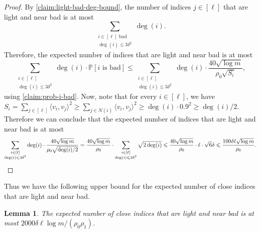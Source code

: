 \documentclass[reqno]{amsart}
\newtheorem{lemma}[theorem]{Lemma}
\theoremstyle{remark}
\theoremstyle{definition}
\numberwithin{theorem}{section}
\renewcommand{\(}{\bigl(}
\renewcommand{\)}{\bigr)\vphantom{)}}
\renewcommand{\le}{\leqslant}
\renewcommand{\ge}{\geqslant}
\renewcommand{\P}{\mathbb{P}}
\newcommand{\ang}[1]{\langle#1\rangle}
\begin{document}
\begin{proof}
By \cref{claim:light-bad-deg-bound}, the number of indices $j\in [\ell]$ that are light and near bad is at most 
\[\sum_{\substack{i\in [\ell]\text{ bad}\\\deg(i)\le 3\delta^2}}\deg(i).\]
Therefore, the expected number of indices that are light and near bad is at most
\[\sum_{\substack{i\in [\ell]\\ \deg(i)\le 3\delta^2}} \deg(i)\cdot \P[i\text{ is bad}] \le \sum_{\substack{i\in [\ell]\\ \deg(i)\le 3\delta^2}} \deg(i)\cdot \frac{40\sqrt{\log m}}{\rho_0 \sqrt{S_i}},\]
using \cref{claim:prob-i-bad}. Now, note that for every $i\in [\ell]$, we have $S_i=\sum_{j\in [\ell]} \ang{v_i, v_j}^2\ge \sum_{j\in N(i)} \ang{v_i, v_j}^2\ge \deg(i)\cdot 0.9^2\ge \deg(i)/2$. Therefore we can conclude that the expected number of indices that are light and near bad is at most
\[\sum_{\substack{i\in [\ell]\\ \deg(i)\le 3\delta^2}}\deg(i)\cdot \frac{40\sqrt{\log m}}{\rho_0 \sqrt{\deg(i)/2}}
= \frac{40\sqrt{\log m}}{\rho_0}\cdot \sum_{\substack{i\in [\ell]\\ \deg(i)\le 3\delta^2}}\sqrt{2\deg(i)}\le \frac{40\sqrt{\log m}}{\rho_0 }\cdot \ell\cdot \sqrt{6}\delta \le \frac{100\delta \ell\sqrt{\log m}}{\rho_0}. \qedhere\]
\end{proof}

Thus we have the following upper bound for the expected number of close indices that are light and near bad.

\begin{lemma}\label{lem:num-near-bad-light-in-F}
    The expected number of close indices that are light and near bad is at most $2000\delta \ell\log m/(\rho_0\rho_1)$.
\end{lemma}
\end{document}

